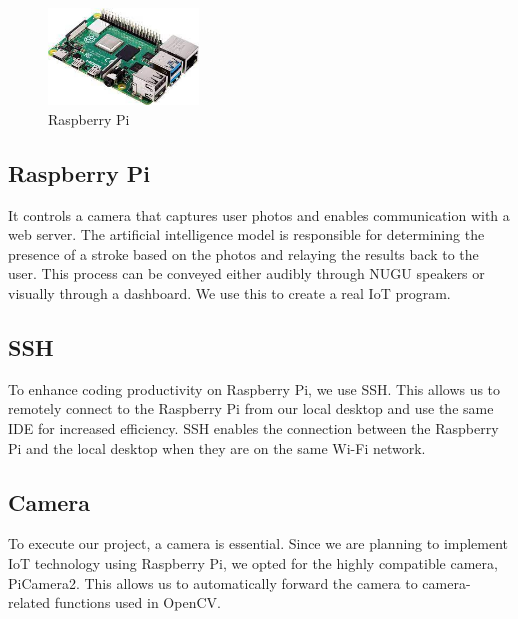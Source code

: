 \begin{figure}[htp]
\centering
\includegraphics[width=4cm]{images/raspberrypi.jpeg}
\caption{Raspberry Pi}
\label{fig:raspberryPi}
\end{figure}

\subsection{\textbf{Raspberry Pi}}
It controls a camera that captures user photos and enables communication with a web server. The artificial intelligence model is responsible for determining the presence of a stroke based on the photos and relaying the results back to the user. This process can be conveyed either audibly through NUGU speakers or visually through a dashboard. We use this to create a real IoT program.\\

\subsection{\textbf{SSH}}
To enhance coding productivity on Raspberry Pi, we use SSH. This allows us to remotely connect to the Raspberry Pi from our local desktop and use the same IDE for increased efficiency.
SSH enables the connection between the Raspberry Pi and the local desktop when they are on the same Wi-Fi network.\\

\subsection{\textbf{Camera}}
To execute our project, a camera is essential. Since we are planning to implement IoT technology using Raspberry Pi, we opted for the highly compatible camera, PiCamera2. This allows us to automatically forward the camera to camera-related functions used in OpenCV.\\

